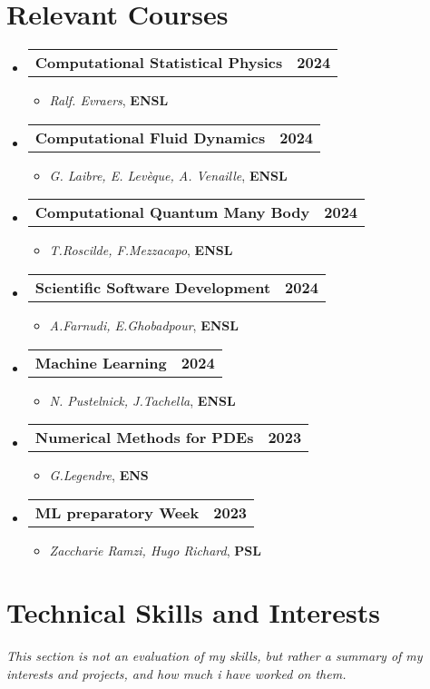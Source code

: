 \documentclass[letterpaper,11pt]{article}
\makeatletter
\newcommand{\resumeItem}[1]{
  \item\small{#1 \vspace{-2pt}}
}
\newcommand{\resumeCoursesHeading}[2]{
  \item
  \begin{tabularx}{1.0\textwidth}{l@{\extracolsep{\fill}}r}
    \small#1 & \textbf{\small #2} \\
  \end{tabularx}\vspace{-7pt}
}
\newcommand{\resumeSubHeadingListStart}{\begin{itemize}[leftmargin=0.0in, label={ }]}
\newcommand{\resumeSubHeadingListEnd}{\end{itemize}}
\newcommand{\resumeItemListStart}{\begin{itemize}[leftmargin=0.15in, label={$\vcenter{\hbox{\color{MyRed}\tiny$\bullet$}}$}]}
\newcommand{\resumeItemListEnd}{\end{itemize}\vspace{-5pt}}
\makeatother
\begin{document}
\begin{minipage}[t]{0.37\textwidth}

  \section{\faChalkboardTeacher\hspace{0.5em}\sffamily\bfseries Relevant Courses}
  \resumeSubHeadingListStart

  \resumeCoursesHeading
  {\textbf{Computational Statistical Physics}}{2024}
  \resumeItemListStart
  \resumeItem{\emph{Ralf. Evraers}, \textbf{ENSL}}
  \resumeItemListEnd

  \resumeCoursesHeading
  {\textbf{Computational Fluid Dynamics}}{2024}
  \resumeItemListStart
  \resumeItem{\emph{G. Laibre, E. Levèque, A. Venaille}, \textbf{ENSL}}
  \resumeItemListEnd

  \resumeCoursesHeading
  {\textbf{Computational Quantum Many Body}}{2024}
  \resumeItemListStart
  \resumeItem{\emph{T.Roscilde, F.Mezzacapo}, \textbf{ENSL}}
  \resumeItemListEnd

  \resumeCoursesHeading
  {\textbf{Scientific Software Development}}{2024}
  \resumeItemListStart
  \resumeItem{\emph{A.Farnudi, E.Ghobadpour}, \textbf{ENSL}}
  \resumeItemListEnd

  \resumeCoursesHeading
  {\textbf{Machine Learning}}{2024}
  \resumeItemListStart
  \resumeItem{\emph{N. Pustelnick, J.Tachella}, \textbf{ENSL}}
  \resumeItemListEnd

  \resumeCoursesHeading
  {\textbf{Numerical Methods for PDEs}}{2023}
  \resumeItemListStart
  \resumeItem{\emph{G.Legendre}, \textbf{ENS}}
  \resumeItemListEnd

  \resumeCoursesHeading
  {\textbf{ML preparatory Week}}{2023}
  \resumeItemListStart
  \resumeItem{\emph{Zaccharie Ramzi, Hugo Richard}, \textbf{PSL}}
  \resumeItemListEnd

  \resumeSubHeadingListEnd

  \section{\faCoffee\hspace{0.5em}\sffamily Technical Skills and Interests}
\vspace{.5em}
  \small{\emph{This section is not an evaluation of my skills, but rather a summary of my interests and projects, and how much i have worked on them.}}
  \vspace{.5em}


\end{minipage}
\end{document}
